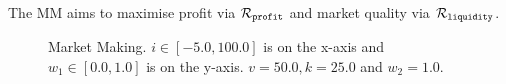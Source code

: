 The MM aims to maximise profit via {\footnotesize $ \mathcal{R}_{\mathtt{profit}} $} and market quality via {\footnotesize $ \mathcal{R}_{\mathtt{liquidity}} $}.

\begin{figure}[h!]
    \centering
    \caption{Market Making. $ i \in \left[ -5.0, 100.0 \right]$ is on the x-axis and $ w_1 \in \left[ 0.0, 1.0 \right]$ is on the y-axis. $ v = 50.0, k = 25.0$ and $w_2 = 1.0.$}
    \label{fig:robot1d}
\end{figure}

